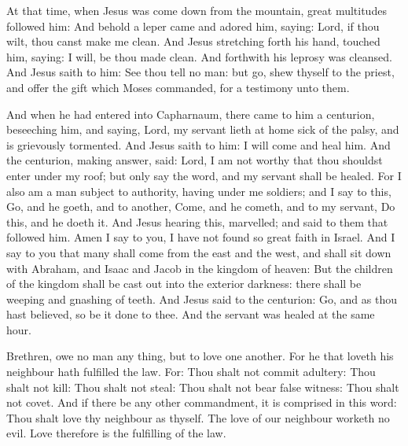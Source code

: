 
At that time, when Jesus was come down from the mountain, great multitudes followed him: And
behold a leper came and adored him, saying: Lord, if thou wilt, thou canst make
me clean.  And Jesus stretching forth his hand, touched him, saying: I will, be
thou made clean. And forthwith his leprosy was cleansed.  And Jesus saith to
him: See thou tell no man: but go, shew thyself to the priest, and offer the
gift which Moses commanded, for a testimony unto them.  

And when he had entered
into Capharnaum, there came to him a centurion, beseeching him, and saying,
Lord, my servant lieth at home sick of the palsy, and is grievously tormented.
And Jesus saith to him: I will come and heal him.  And the centurion, making
answer, said: Lord, I am not worthy that thou shouldst enter under my roof; but
only say the word, and my servant shall be healed.  For I also am a man subject
to authority, having under me soldiers; and I say to this, Go, and he goeth,
and to another, Come, and he cometh, and to my servant, Do this, and he doeth
it.  And Jesus hearing this, marvelled; and said to them that followed him.
Amen I say to you, I have not found so great faith in Israel.  And I say to you
that many shall come from the east and the west, and shall sit down with
Abraham, and Isaac and Jacob in the kingdom of heaven: But the children of the
kingdom shall be cast out into the exterior darkness: there shall be weeping
and gnashing of teeth.  And Jesus said to the centurion: Go, and as thou hast
believed, so be it done to thee. And the servant was healed at the same hour.


\bigskip




Brethren, owe no man any thing, but to love one another. For he that loveth his neighbour
hath fulfilled the law.  For: Thou shalt not commit adultery: Thou shalt not
kill: Thou shalt not steal: Thou shalt not bear false witness: Thou shalt not
covet. And if there be any other commandment, it is comprised in this word:
Thou shalt love thy neighbour as thyself.  The love of our neighbour worketh no
evil. Love therefore is the fulfilling of the law.



